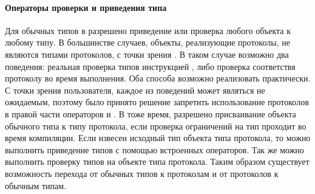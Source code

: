 \paragraph{Операторы проверки и приведения типа}
Для обычных типов в  разрешено приведение или проверка любого объекта к любому типу. В большинстве случаев, объекты, реализующие протоколы, не являются типами протоколов, с точки зрения . В таком случае возможно два поведения: реальная проверка типов инструкцией , либо проверка соответствя протоколу во время выполнения. Оба способа возможно реализовать практически. С точки зрения пользователя, каждое из поведений может являться не ожидаемым, поэтому было принято решение запретить использование протоколов в правой части операторов  и . В тоже время, разрешено присваивание объекта обычного типа к типу протокола, если проверка ограничений на тип проходит во время компиляции. Если извесен исходный тип объекта типа протокола, то можно выполнить приведение типов с помощью встроенных операторов. Так же можно выполнить проверку типов на объекте типа протокола. Таким образом существует возможность перехода от обычных типов к протоколам и от протоколов к обычным типам.
